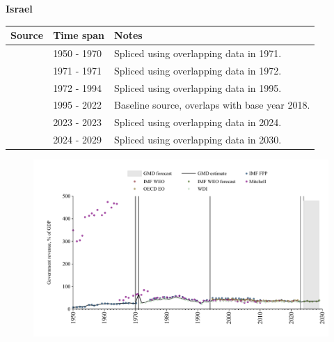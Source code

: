 \documentclass[12pt,a4paper,landscape]{article}
\begin{document}
\begin{adjustbox}{max totalsize={\paperwidth}{\paperheight},center}
\begin{minipage}[t][\textheight][t]{\textwidth}
\vspace*{0.5cm}
{}
\begin{center}
{\Large\bfseries Israel}
\end{center}
\vspace{0.5cm}
\begin{table}[H]
\centering
\small
\begin{tabular}{|l|l|l|}
\hline
\textbf{Source} & \textbf{Time span} & \textbf{Notes} \\
\hline
\rowcolor{white}\cite{IMF_FPP}& 1950 - 1970 &Spliced using overlapping data in 1971.\\
\rowcolor{lightgray}\cite{Mitchell}& 1971 - 1971 &Spliced using overlapping data in 1972.\\
\rowcolor{white}\cite{WDI}& 1972 - 1994 &Spliced using overlapping data in 1995.\\
\rowcolor{lightgray}\cite{OECD_EO}& 1995 - 2022 &Baseline source, overlaps with base year 2018.\\
\rowcolor{white}\cite{WDI}& 2023 - 2023 &Spliced using overlapping data in 2024.\\
\rowcolor{lightgray}\cite{IMF_WEO_forecast}& 2024 - 2029 &Spliced using overlapping data in 2030.\\
\hline
\end{tabular}
\end{table}
\begin{figure}[H]
\centering
\includegraphics[width=\textwidth,height=0.6\textheight,keepaspectratio]{graphs/ISR_govrev_GDP.pdf}
\end{figure}
\end{minipage}
\end{adjustbox}
\end{document}
